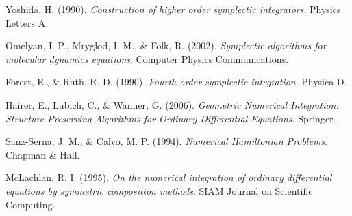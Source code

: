 \documentclass[12pt,a4paper]{article}
\begin{document}
\begin{enumerate}[leftmargin=1.5cm, label={[\arabic*]}]
\item Yoshida, H. (1990). \textit{Construction of higher order symplectic integrators}. Physics Letters A.

\item Omelyan, I. P., Mryglod, I. M., \& Folk, R. (2002). \textit{Symplectic algorithms for molecular dynamics equations}. Computer Physics Communications.

\item Forest, E., \& Ruth, R. D. (1990). \textit{Fourth-order symplectic integration}. Physica D.

\item Hairer, E., Lubich, C., \& Wanner, G. (2006). \textit{Geometric Numerical Integration: Structure-Preserving Algorithms for Ordinary Differential Equations}. Springer.

\item Sanz-Serna, J. M., \& Calvo, M. P. (1994). \textit{Numerical Hamiltonian Problems}. Chapman \& Hall.

\item McLachlan, R. I. (1995). \textit{On the numerical integration of ordinary differential equations by symmetric composition methods}. SIAM Journal on Scientific Computing.
\end{enumerate}
\end{document}
